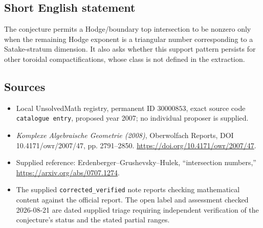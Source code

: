 \documentclass[11pt]{article}
\begin{document}
\subsection{Short English statement}
The conjecture permits a Hodge/boundary top intersection to be nonzero only when the remaining Hodge exponent is a triangular number corresponding to a Satake-stratum dimension. It also asks whether this support pattern persists for other toroidal compactifications, whose class is not defined in the extraction.
\subsection{Sources}
\begin{itemize}
\item Local UnsolvedMath registry, permanent ID \(30000853\), exact source code \texttt{catalogue entry}, proposed year 2007; no individual proposer is supplied.
\item \emph{Komplexe Algebraische Geometrie (2008)}, Oberwolfach Reports, DOI 10.4171/owr/2007/47, pp. 2791--2850. \url{https://doi.org/10.4171/owr/2007/47}.
\item Supplied reference: Erdenberger--Grushevsky--Hulek, ``intersection numbers,'' \url{https://arxiv.org/abs/0707.1274}.
\item The supplied \texttt{corrected\_verified} note reports checking mathematical content against the official report. The open label and assessment checked 2026-08-21 are dated supplied triage requiring independent verification of the conjecture's status and the stated partial ranges.
\end{itemize}
\end{document}
